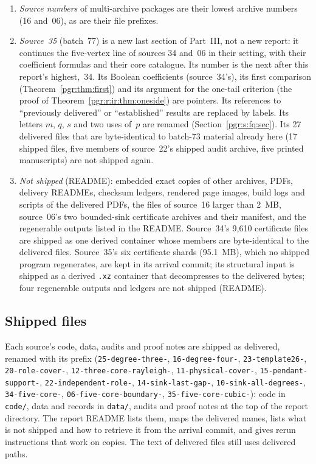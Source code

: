 \documentclass[11pt]{article}
\numberwithin{equation}{section}
\theoremstyle{definition}\newtheorem{definition}[theorem]{Definition}\newtheorem{remark}[theorem]{Remark}
\begin{document}
\begin{enumerate}[leftmargin=*]
  $4\gamma_2^2\ge9\gamma_1\gamma_3$, certified by binomial squares only,
  and an alternative first-gap argument valid in degree four; it survives
  in the arrival commit.
\item \emph{Source numbers} of multi-archive packages are their lowest
  archive numbers (16 and~06), as are their file prefixes.
\item \emph{Source~35} (batch~77) is a new last section of Part~III, not a
  new report: it continues the five-vertex line of sources 34 and~06 in
  their setting, with their coefficient formulas and their core
  catalogue. Its number is the next after this report's highest,~34. Its
  Boolean coefficients (source~34's), its first comparison
  (Theorem~\ref{pgr:thm:first}) and its argument for the one-tail
  criterion (the proof of Theorem~\ref{pgr:r:ir:thm:oneside}) are
  pointers. Its references to ``previously delivered'' or ``established''
  results are replaced by labels. Its letters $m$, $q$, $s$ and two uses
  of~$p$ are renamed (Section~\ref{pgr:s:fq:sec}). Its 27 delivered files
  that are byte-identical to batch-73 material already here (17 shipped
  files, five members of source~22's shipped audit archive, five printed
  manuscripts) are not shipped again.
\item \emph{Not shipped} (README): embedded exact copies of other archives,
  PDFs, delivery READMEs, checksum ledgers, rendered page images, build
  logs and scripts of the delivered PDFs, the files of source~16 larger
  than 2~MB, source~06's two bounded-sink certificate archives and their
  manifest, and the regenerable outputs listed in the README. Source~34's
  9,610 certificate files are shipped as one derived container whose
  members are byte-identical to the delivered files. Source~35's six
  certificate shards (95.1~MB), which no shipped program regenerates, are
  kept in its arrival commit; its structural input is shipped as a
  derived \texttt{.xz} container that decompresses to the delivered
  bytes; four regenerable outputs and ledgers are not shipped (README).
\end{enumerate}

\subsection{Shipped files}\label{pgr:sec:prov:files}
Each source's code, data, audits and proof notes are shipped as delivered,
renamed with its prefix (\nolinkurl{25-degree-three-}, \nolinkurl{16-degree-four-},
\nolinkurl{23-template26-}, \nolinkurl{20-role-cover-},
\nolinkurl{12-three-core-rayleigh-}, \nolinkurl{11-physical-cover-},
\nolinkurl{15-pendant-support-}, \nolinkurl{22-independent-role-},
\nolinkurl{14-sink-last-gap-}, \nolinkurl{10-sink-all-degrees-},
\nolinkurl{34-five-core-}, \nolinkurl{06-five-core-boundary-},
\nolinkurl{35-five-core-cubic-}): code in
\texttt{code/}, data and records in \texttt{data/}, audits and proof notes
at the top of the report directory. The report README lists them, maps the
delivered names, lists what is not shipped and how to retrieve it from the
arrival commit, and gives rerun instructions that work on copies. The text
of delivered files still uses delivered paths.
\end{document}
